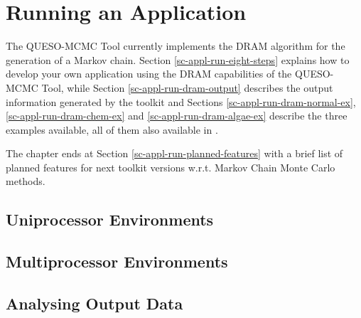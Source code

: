 \chapter{Running an Application}\label{ch-appl-run}
\thispagestyle{headings}

The QUESO-MCMC Tool currently implements the DRAM algorithm \cite{HaLaMiSa06} for the generation of a Markov chain.
Section \ref{sc-appl-run-eight-steps} explains how to develop your own application using the DRAM capabilities of the QUESO-MCMC Tool, while
Section \ref{sc-appl-run-dram-output} describes the output information generated by the toolkit and
Sections
\ref{sc-appl-run-dram-normal-ex},
\ref{sc-appl-run-dram-chem-ex} and
\ref{sc-appl-run-dram-algae-ex}
describe the three examples available,
all of them also available in \cite{mcmctool}.

The chapter ends at Section \ref{sc-appl-run-planned-features} with a brief list of planned features for next toolkit versions w.r.t. Markov Chain Monte Carlo methods.

\section{Uniprocessor Environments}

\section{Multiprocessor Environments}

\section{Analysing Output Data}
